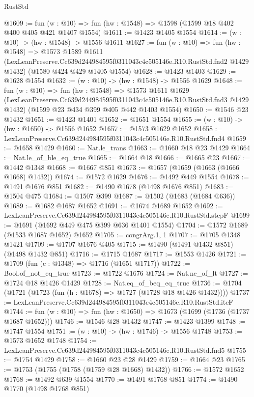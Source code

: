 \begin{lexlean}{RustStd}
\begin{coremodule}
@1609 := fun (w : @10) => fun (hw : @1548) => @1598 (@1599 @18 @402 @400 @405 @421 @1407 @1554)
@1611 := @1423 @1405 @1554
@1614 := (w : @10) -> (hw : @1548) -> @1556 @1611
@1627 := fun (w : @10) =>
  fun (hw : @1548) =>
  @1573
    @1589
    @1611
    (LexLeanPreserve.Cc639d244984595f0311043c4c505146e.R10.RustStd.fnd2 @1429 @1432)
    (@1580 @424 @429 @1405 @1554)
@1628 := @1423 @1403
@1629 := @1628 @1554
@1632 := (w : @10) -> (hw : @1548) -> @1556 @1629
@1648 := fun (w : @10) =>
  fun (hw : @1548) =>
  @1573
    @1611
    @1629
    (LexLeanPreserve.Cc639d244984595f0311043c4c505146e.R10.RustStd.fnd3 @1429 @1432)
    (@1599 @23 @434 @399 @405 @442 @1403 @1554)
@1650 := @1546 @23 @1432
@1651 := @1423 @1401
@1652 := @1651 @1554
@1655 := (w : @10) -> (hw : @1650) -> @1556 @1652
@1657 := @1573 @1629 @1652
@1658 := LexLeanPreserve.Cc639d244984595f0311043c4c505146e.R10.RustStd.fnd4
@1659 := @1658 @1429
@1660 := Nat.le_trans
@1663 := @1660 @18 @23 @1429
@1664 := Nat.le_of_ble_eq_true
@1665 := @1664 @18
@1666 := @1665 @23
@1667 := @1442 @1348
@1668 := @1667 @851
@1673 := @1657 (@1659 (@1663 (@1666 @1668) @1432))
@1674 := @1572 @1629
@1676 := @1492 @449 @1554
@1678 := @1491 @1676 @851
@1682 := @1490 @1678 (@1498 @1676 @851)
@1683 := @1504 @475
@1684 := @1507 @399
@1687 := @1502 (@1683 (@1684 @636))
@1689 := @1682 @1687 @1652
@1691 := @1674 @1689 @1652
@1692 := LexLeanPreserve.Cc639d244984595f0311043c4c505146e.R10.RustStd.stepF
@1699 := @1691 (@1692 @449 @475 @399 @636 @1401 @1554)
@1704 := @1572 @1689 (@1533 @1687 @1652) @1652
@1705 := congrArg.{1, 1}
@1707 := @1705 @1348 @1421
@1709 := @1707 @1676 @405
@1715 := @1490 (@1491 @1432 @851) (@1498 @1432 @851)
@1716 := @1715 @1687
@1717 := @1553 @1426
@1721 := @1709 (fun (c : @1348) => @1716 (@1651 @1717))
@1722 := Bool.of_not_eq_true
@1723 := @1722 @1676
@1724 := Nat.ne_of_lt
@1727 := @1724 @18 @1426 @1429
@1728 := Nat.eq_of_beq_eq_true
@1736 := @1704 (@1721 (@1723 (fun (h : @1678) => @1727 (@1728 @18 @1426 @1432))))
@1737 := LexLeanPreserve.Cc639d244984595f0311043c4c505146e.R10.RustStd.iteF
@1744 := fun (w : @10) => fun (hw : @1650) => @1673 (@1699 (@1736 (@1737 @1687 @1652)))
@1746 := @1546 @28 @1432
@1747 := @1423 @1399
@1748 := @1747 @1554
@1751 := (w : @10) -> (hw : @1746) -> @1556 @1748
@1753 := @1573 @1652 @1748
@1754 := LexLeanPreserve.Cc639d244984595f0311043c4c505146e.R10.RustStd.fnd5
@1755 := @1754 @1429
@1758 := @1660 @23 @28 @1429
@1759 := @1664 @23
@1765 := @1753 (@1755 (@1758 (@1759 @28 @1668) @1432))
@1766 := @1572 @1652
@1768 := @1492 @639 @1554
@1770 := @1491 @1768 @851
@1774 := @1490 @1770 (@1498 @1768 @851)

\end{coremodule}
\end{lexlean}
